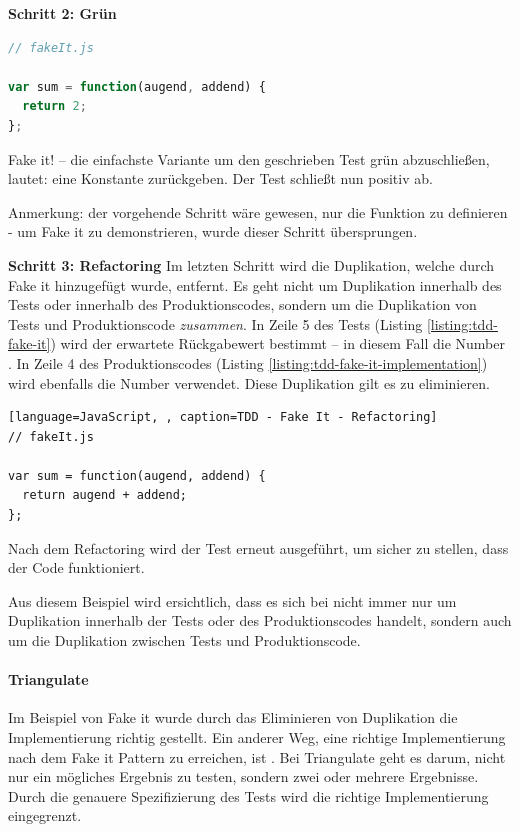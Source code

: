 \newpage
\textbf{Schritt 2: Grün}
\begin{lstlisting}[language=JavaScript, caption=TDD - Fake It - Implementation, label=listing:tdd-fake-it-implementation]
// fakeIt.js

var sum = function(augend, addend) {
  return 2;
};
\end{lstlisting}

Fake it! -- die einfachste Variante um den geschrieben Test grün abzuschließen, lautet: eine Konstante zurückgeben. Der Test schließt nun positiv ab.

Anmerkung: der vorgehende Schritt wäre gewesen, nur die Funktion  zu definieren - um Fake it zu demonstrieren, wurde dieser Schritt übersprungen.

\vspace{0.5cm}
\textbf{Schritt 3: Refactoring} \newline
Im letzten Schritt wird die Duplikation, welche durch Fake it hinzugefügt wurde, entfernt. Es geht nicht um Duplikation innerhalb des Tests oder innerhalb des Produktionscodes, sondern um die Duplikation von Tests und Produktionscode \textit{zusammen}. In Zeile 5 des Tests (Listing \ref{listing:tdd-fake-it}) wird der erwartete Rückgabewert bestimmt -- in diesem Fall die Number \glqq{2\grqq}. In Zeile 4 des Produktionscodes (Listing \ref{listing:tdd-fake-it-implementation}) wird ebenfalls die Number \glqq{2\grqq} verwendet. Diese Duplikation gilt es zu eliminieren.

\begin{lstlisting}[language=JavaScript, , caption=TDD - Fake It - Refactoring]
// fakeIt.js

var sum = function(augend, addend) {
  return augend + addend;
};
\end{lstlisting}

Nach dem Refactoring wird der Test erneut ausgeführt, um sicher zu stellen, dass der Code funktioniert.

Aus diesem Beispiel wird ersichtlich, dass es sich bei  nicht immer nur um Duplikation innerhalb der Tests oder des Produktionscodes handelt, sondern auch um die Duplikation zwischen Tests und Produktionscode.

\paragraph{Triangulate}

Im Beispiel von Fake it wurde durch das Eliminieren von Duplikation die Implementierung richtig gestellt. Ein anderer Weg, eine richtige Implementierung nach dem Fake it Pattern zu erreichen, ist . Bei Triangulate geht es darum, nicht nur ein mögliches Ergebnis zu testen, sondern zwei oder mehrere Ergebnisse. Durch die genauere Spezifizierung des Tests wird die richtige Implementierung eingegrenzt.

